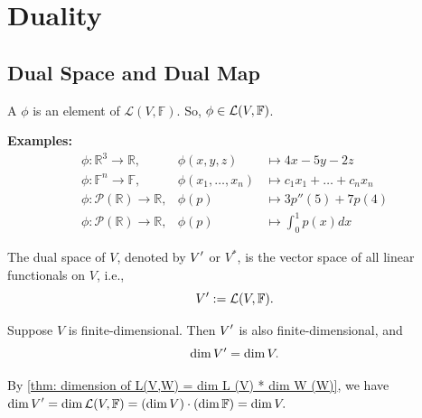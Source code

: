 
\section{Duality}
\subsection{Dual Space and Dual Map}

\setcounter{thm}{107}
\begin{mydef}
  A  $\phi$ is an element of $\mathcal{L}(V, \mathbb{F})$. So, $\phi \in \mathcal{L}(V, \mathbb{F})$.
\end{mydef}

\textbf{Examples:}
\begin{equation}
  \begin{array}{lll}
    \phi: \mathbb{R}^3  \to \mathbb{R}, &\phi (x,y,z)  & \mapsto 4x-5y-2z \\
    \phi: \mathbb{F}^n  \to \mathbb{F}, &\phi (x_1, \dots, x_n)
    & \mapsto c_1x_1 + \dots + c_nx_n  \\
    \phi: \mathcal{P} (\mathbb{R})  \to \mathbb{R},
    & \phi(p) & \mapsto 3p''(5) + 7p(4) \\
    \phi: \mathcal{P}(\mathbb{R}) \to \mathbb{R},
    & \phi(p)  &\mapsto \textstyle \int_{0}^{1} p(x) dx
  \end{array}
\end{equation}

\setcounter{thm}{109}
\begin{mydef}
  The dual space of $V$, denoted by $\displaystyle V'$ or $V^{*}$, is the vector space of all linear functionals on $V$, i.e.,
  \begin{equation}
    \displaystyle V' := \mathcal{L}(V, \mathbb{F}).
  \end{equation}
\end{mydef}

\begin{thm} [$\dim \dual{V} = \dim V$]
  \label{thm: dim V' = dim V}
  Suppose $V$ is finite-dimensional. Then $\displaystyle V'$ is also finite-dimensional, and
  \begin{equation}
    \dim \displaystyle V' = \dim V.
  \end{equation}
\end{thm}
\begin{prf}
  By \ref{thm: dimension of L(V,W) = dim L (V) * dim W (W)}, we have
  $\dim \displaystyle V' = \dim \mathcal{L}(V, \mathbb{F})=(\dim V) \cdot (\dim \mathbb{F}) = \dim V.$
\end{prf}


